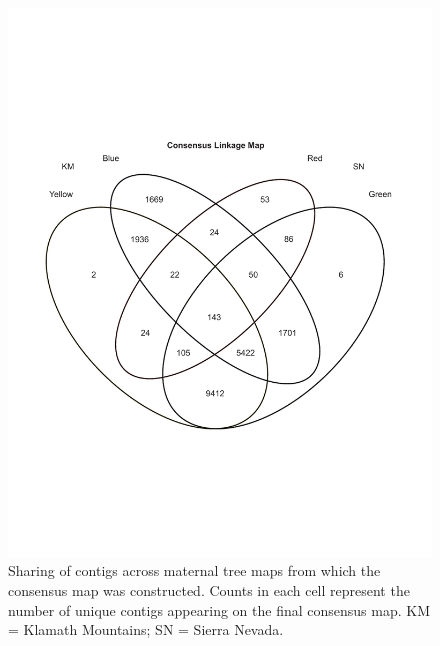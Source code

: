 \documentclass[smallextended]{svjour3}
\begin{document}
\clearpage

\begin{figure}[ht]
   \centering
 \includegraphics[width=1.0\textwidth]{Figure02_TGG}
  \caption{Sharing of contigs across maternal tree maps from which the consensus map was constructed. Counts in each cell
  represent the number of unique contigs appearing on the final consensus map. KM = Klamath Mountains; SN = Sierra Nevada.}
  \label{f:Figure02_TGG}
\end{figure}
 
\end{document}
